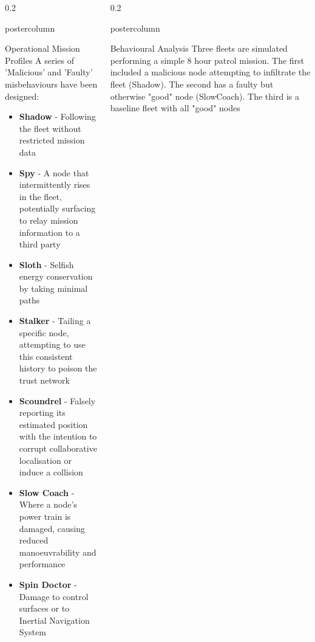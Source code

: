\documentclass[final,hyperref={pdfpagelabels=false}]{beamer}
\def\colwidth{0.2\linewidth}
\begin{document}
\begin{frame}[fragile]
\begin{columns}[T]
\begin{column}{\colwidth}
\begin{beamercolorbox}[center,wd=\textwidth]{postercolumn}
\begin{minipage}[T]{.98\textwidth}
{\begin{block}{Operational Mission Profiles}
							A series of 'Malicious' and 'Faulty' misbehaviours have been designed:
							\begin{itemize}
								\item \textbf{Shadow} - Following the fleet without restricted mission data
								\item \textbf{Spy} - A node that intermittently rises in the fleet, potentially surfacing to relay mission information to a third party
								\item \textbf{Sloth} - Selfish energy conservation by taking minimal paths
								\item \textbf{Stalker} - Tailing a specific node, attempting to use this consistent history to poison the trust network
								\item \textbf{Scoundrel} - Falsely reporting its estimated position with the intention to corrupt collaborative localisation or induce a collision
								\item \textbf{Slow Coach} - Where a node's power train is damaged, causing reduced manoeuvrability and performance
								\item \textbf{Spin Doctor} - Damage to control surfaces or to Inertial Navigation System
							\end{itemize}
							
						\end{block}
												
												
					}
				\end{minipage}
			\end{beamercolorbox}
		\end{column}
				
		\begin{column}{\colwidth}
			\begin{beamercolorbox}[center,wd=\textwidth]{postercolumn}
				\begin{minipage}[T]{.98\textwidth} %
					\parbox[t]{\textwidth}{ %
						\begin{block}{Behavioural Analysis}
							Three fleets are simulated performing a simple 8 hour patrol mission. The first included a malicious node attempting to infiltrate the fleet (Shadow). The second has a faulty but otherwise "good" node (SlowCoach). The third is a baseline fleet with all "good" nodes
														

\end{block}}
\end{minipage}
\end{beamercolorbox}
\end{column}
\end{columns}
\end{frame}
\end{document}
